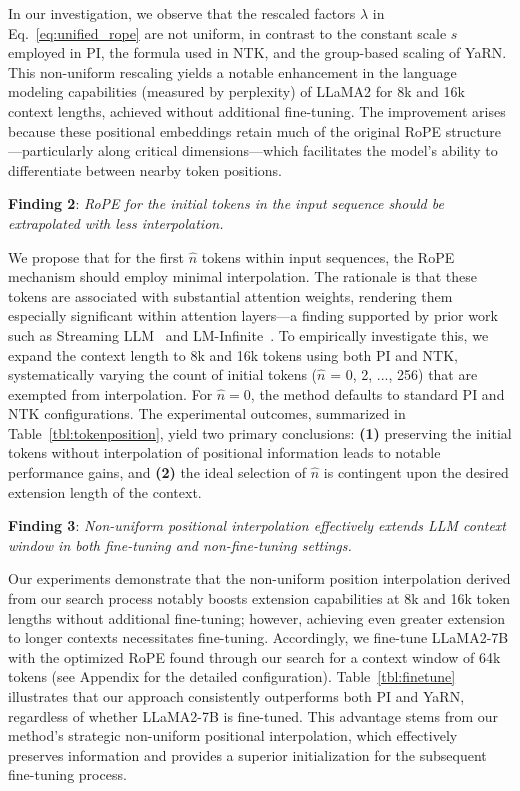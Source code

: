 In our investigation, we observe that the rescaled factors $\lambda$ in Eq.~\ref{eq:unified_rope} are not uniform, in contrast to the constant scale $s$ employed in PI, the formula used in NTK, and the group-based scaling of YaRN. This non-uniform rescaling yields a notable enhancement in the language modeling capabilities (measured by perplexity) of LLaMA2 for 8k and 16k context lengths, achieved without additional fine-tuning. The improvement arises because these positional embeddings retain much of the original RoPE structure—particularly along critical dimensions—which facilitates the model's ability to differentiate between nearby token positions.

\textbf{Finding 2}: \textit{RoPE for the initial tokens in the input sequence should be extrapolated with less interpolation.} 

We propose that for the first $\hat{n}$ tokens within input sequences, the RoPE mechanism should employ minimal interpolation. The rationale is that these tokens are associated with substantial attention weights, rendering them especially significant within attention layers—a finding supported by prior work such as Streaming LLM~\cite{streamingllm} and LM-Infinite~\cite{han2023lminfinite}. To empirically investigate this, we expand the context length to 8k and 16k tokens using both PI and NTK, systematically varying the count of initial tokens ($\hat n$ = 0, 2, ..., 256) that are exempted from interpolation. For $\hat n = 0$, the method defaults to standard PI and NTK configurations. The experimental outcomes, summarized in Table~\ref{tbl:tokenposition}, yield two primary conclusions: \textbf{(1)} preserving the initial tokens without interpolation of positional information leads to notable performance gains, and \textbf{(2)} the ideal selection of $\hat n$ is contingent upon the desired extension length of the context.

\textbf{Finding 3}: \textit{Non-uniform positional interpolation effectively extends LLM context window in both fine-tuning and non-fine-tuning settings.} 

Our experiments demonstrate that the non-uniform position interpolation derived from our search process notably boosts extension capabilities at 8k and 16k token lengths without additional fine-tuning; however, achieving even greater extension to longer contexts necessitates fine-tuning. Accordingly, we fine-tune LLaMA2-7B with the optimized RoPE found through our search for a context window of 64k tokens (see Appendix for the detailed configuration). Table~\ref{tbl:finetune} illustrates that our approach consistently outperforms both PI and YaRN, regardless of whether LLaMA2-7B is fine-tuned. This advantage stems from our method's strategic non-uniform positional interpolation, which effectively preserves information and provides a superior initialization for the subsequent fine-tuning process.

